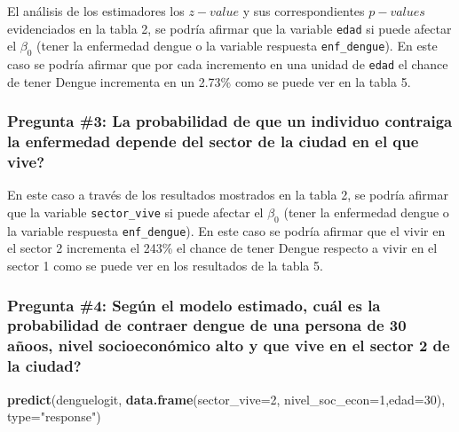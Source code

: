 \documentclass[
]{article}
\newenvironment{Shaded}{\begin{snugshade}}{\end{snugshade}}
\newcommand{\DataTypeTok}[1]{\textcolor[rgb]{0.13,0.29,0.53}{#1}}
\newcommand{\DecValTok}[1]{\textcolor[rgb]{0.00,0.00,0.81}{#1}}
\newcommand{\KeywordTok}[1]{\textcolor[rgb]{0.13,0.29,0.53}{\textbf{#1}}}
\newcommand{\NormalTok}[1]{#1}
\newcommand{\StringTok}[1]{\textcolor[rgb]{0.31,0.60,0.02}{#1}}
\begin{document}
El análisis de los estimadores los \(z-value\) y sus correspondientes
\(p-values\) evidenciados en la tabla 2, se podría afirmar que la
variable \texttt{edad} si puede afectar el \(\beta_0\) (tener la
enfermedad dengue o la variable respuesta \texttt{enf\_dengue}). En este
caso se podría afirmar que por cada incremento en una unidad de
\texttt{edad} el chance de tener Dengue incrementa en un 2.73\% como se
puede ver en la tabla 5.

\hypertarget{pregunta-3-la-probabilidad-de-que-un-individuo-contraiga-la-enfermedad-depende-del-sector-de-la-ciudad-en-el-que-vive}{%
\subsubsection{Pregunta \#3: La probabilidad de que un individuo
contraiga la enfermedad depende del sector de la ciudad en el que
vive?}\label{pregunta-3-la-probabilidad-de-que-un-individuo-contraiga-la-enfermedad-depende-del-sector-de-la-ciudad-en-el-que-vive}}

En este caso a través de los resultados mostrados en la tabla 2, se
podría afirmar que la variable \texttt{sector\_vive} si puede afectar el
\(\beta_0\) (tener la enfermedad dengue o la variable respuesta
\texttt{enf\_dengue}). En este caso se podría afirmar que el vivir en el
sector 2 incrementa el 243\% el chance de tener Dengue respecto a vivir
en el sector 1 como se puede ver en los resultados de la tabla 5.

\hypertarget{pregunta-4-seguxfan-el-modelo-estimado-cuuxe1l-es-la-probabilidad-de-contraer-dengue-de-una-persona-de-30-auxf1oos-nivel-socioeconuxf3mico-alto-y-que-vive-en-el-sector-2-de-la-ciudad}{%
\subsubsection{Pregunta \#4: Según el modelo estimado, cuál es la
probabilidad de contraer dengue de una persona de 30 añoos, nivel
socioeconómico alto y que vive en el sector 2 de la
ciudad?}\label{pregunta-4-seguxfan-el-modelo-estimado-cuuxe1l-es-la-probabilidad-de-contraer-dengue-de-una-persona-de-30-auxf1oos-nivel-socioeconuxf3mico-alto-y-que-vive-en-el-sector-2-de-la-ciudad}}

\begin{Shaded}
\begin{Highlighting}[]
\KeywordTok{predict}\NormalTok{(denguelogit, }\KeywordTok{data.frame}\NormalTok{(}\DataTypeTok{sector_vive=}\DecValTok{2}\NormalTok{, }\DataTypeTok{nivel_soc_econ=}\DecValTok{1}\NormalTok{,}\DataTypeTok{edad=}\DecValTok{30}\NormalTok{), }\DataTypeTok{type=}\StringTok{"response"}\NormalTok{)}
\end{Highlighting}
\end{Shaded}
\end{document}
